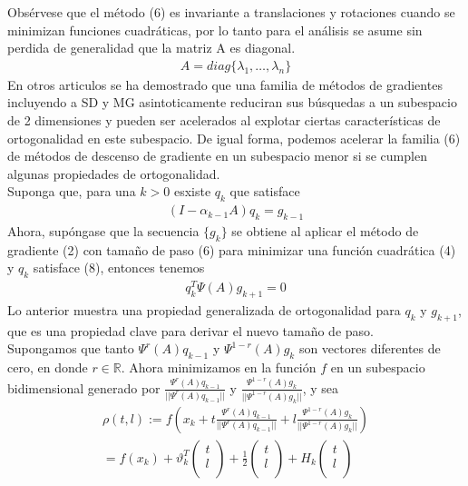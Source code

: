 \documentclass[conference]{IEEEtran}
\begin{document}
    Obsérvese que el método (6) es invariante a translaciones y rotaciones cuando se minimizan funciones cuadráticas, por lo tanto para el análisis se asume sin perdida de generalidad que la matriz A es diagonal.
    \begin{align}
        A = diag\{\lambda_1, \hdots, \lambda_n\}
    \end{align}
    En otros articulos se ha demostrado que una familia de métodos de gradientes incluyendo a SD y MG asintoticamente reduciran sus búsquedas a un subespacio de 2 dimensiones y pueden ser acelerados al explotar ciertas características de ortogonalidad en este subespacio. De igual forma, podemos acelerar la familia (6) de métodos de descenso de gradiente en un subespacio menor si se cumplen algunas propiedades de ortogonalidad.\\
    Suponga que, para una $k>0$ esxiste $q_k$ que satisface
    \begin{align}
        (I - \alpha_{k-1}A)q_k = g_{k-1}
    \end{align}
    Ahora, supóngase que la secuencia $\{g_k\}$ se obtiene al aplicar el método de gradiente (2) con tamaño de paso (6) para minimizar una función cuadrática (4) y $q_k$ satisface (8), entonces tenemos
    \begin{align}
        q_k^T \Psi(A) g_{k+1} = 0
    \end{align}
    Lo anterior muestra una propiedad generalizada de ortogonalidad para $q_k$ y $g_{k+1}$, que es una propiedad clave para derivar el nuevo tamaño de paso.\\
    Supongamos que tanto $\Psi^r(A)q_{k-1}$ y $\Psi^{1-r}(A)g_k$ son vectores diferentes de cero, en donde $r \in \mathbb{R}$. Ahora minimizamos en la función $f$ en un subespacio bidimensional generado por $\frac{\Psi^r(A)q_{k-1}}{||\Psi^r(A)q_{k-1}||}$ y $\frac{\Psi^{1-r}(A)g_{k}}{||\Psi^{1-r}(A)g_{k}||}$, y sea
    \begin{align}
        \rho(t,l):= f(x_k + t\frac{\Psi^r(A)q_{k-1}}{||\Psi^r(A)q_{k-1}||} + l\frac{\Psi^{1-r}(A)g_{k}}{||\Psi^{1-r}(A)g_{k}||} )\\ \nonumber
        = f(x_k) + \vartheta_k^T\left(\begin{matrix}
    t \\
    l\\
    \end{matrix}\right) + \frac{1}{2}\left(\begin{matrix}
    t \\
    l\\
    \end{matrix}\right) + H_k\left(\begin{matrix}
    t \\
    l\\
    \end{matrix}\right)
    \end{align}
\end{document}

